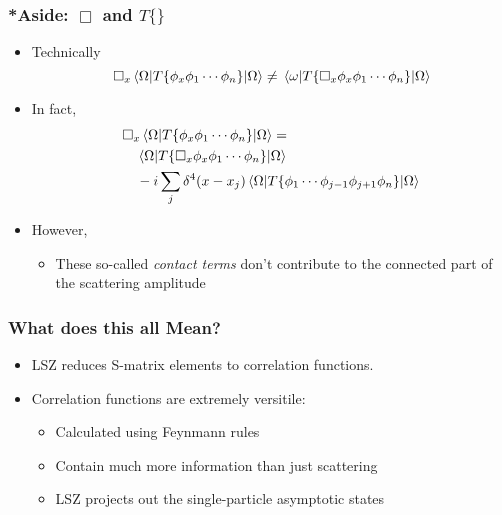 \documentclass{beamer}
\begin{document}
\begin{frame}
\frametitle{*Aside: $\Box$ and $T\{\}$}
\begin{itemize}
    \item<1-> Technically
    \[ \Box_x\mel{\Omega}{T\{\phi_x\phi_1\cdots\phi_n\}}{\Omega} \neq \mel{\omega}{T\{\Box_x\phi_x\phi_1\cdots\phi_n\}}{\Omega} \]
    \item<2-> In fact,
    \begin{align*} 
        &\Box_x\mel{\Omega}{T\{\phi_x\phi_1\cdots\phi_n\}}{\Omega} = \\
        &\quad \mel{\Omega}{T\{\Box_x\phi_x\phi_1\cdots\phi_n\}}{\Omega} \\
        &\quad -i\sum_j \delta^4(x-x_j)\mel{\Omega}{T\{\phi_1\cdots\phi_{j-1}\phi_{j+1}\phi_n\}}{\Omega} 
    \end{align*}
    \item<3-> However,
    \begin{itemize}
        \item These so-called \textit{contact terms} don't contribute to the connected part of the scattering amplitude
    \end{itemize}

\end{itemize}
\end{frame}

\begin{frame}
\frametitle{What does this all Mean?}
\begin{itemize}
    \item<2-> LSZ reduces S-matrix elements to correlation functions.
    \item<3-> Correlation functions are extremely versitile:
    \begin{itemize}
        \item<4-> Calculated using Feynmann rules
        \item<5-> Contain much more information than just scattering
        \item<6-> LSZ projects out the single-particle asymptotic states
    \end{itemize}
\end{itemize}
\end{frame}
\end{document}

